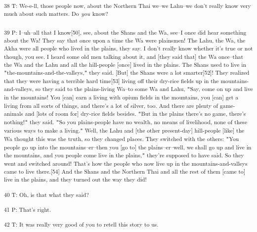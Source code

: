 \textsuperscript{38 T: We-e-ll, those people now, about the Northern Thai we--we
Lahu--we don't really know very much about such matters. Do }\textsuperscript{\textit{you}}\textsuperscript{
know? }

\textsuperscript{39 P: I--uh--all that I know[50], see, about the Shans and the
Wa, see--I once did hear something about the Wa! They say that once upon a time
the Wa were plainsmen! The Lahu, the Wa, the Akha were all people who lived in
the plains, they say. I don't really know whether it's true or not though, you
see. I heard some old men talking about it, and [they said that] the Wa once--that
the Wa and the Lahu and all the hill-people [once] lived in the plains. The Shans
used to live in \texttt{"}the-mountains-and-the-valleys,\texttt{"} they said. [But]
the Shans were a lot smarter[52]! They realized that they were having a terrible
hard time[53] living off their dry-rice fields up in the mountains-and-valleys,
so they said to the plains-living Wa--to some Wa and Lahu, \texttt{"}Say, come
on up and live in the mountains! You [can] earn a living with opium fields in the
mountains, you [can] get a living from all sorts of things, and there's a lot of
silver, too. And there are plenty of game-animals and [lots of room for] dry-rice
fields besides. \texttt{"}But in the plains there's no game, there's nothing!\texttt{"}
they said. \texttt{"}So you plains-people have no wealth, no means of livelihood,
none of these various ways to make a living.\texttt{"} Well, the Lahu and [the
other present-day] hill-people [like] the Wa thought this was the truth, so they
changed places. They switched with the others: \texttt{"}You people go up into
the mountains--er--then you [go to] the plains--er--well, we shall go up and live
in the mountains, and you people come live in the plains,\texttt{"} they're supposed
to have said. So they went and switched around! That's how the people who now live
up in the mountains-and-valleys came to live there.[54] And the Shans and the Northern
Thai and all the rest of them [came to] live in the plains, and they turned out
the way they did! }

\textsuperscript{40 T: Oh, is that what they said?}

\textsuperscript{41 P: That's right.}

\textsuperscript{42 T: It was really very good of you to retell this story to us.}

